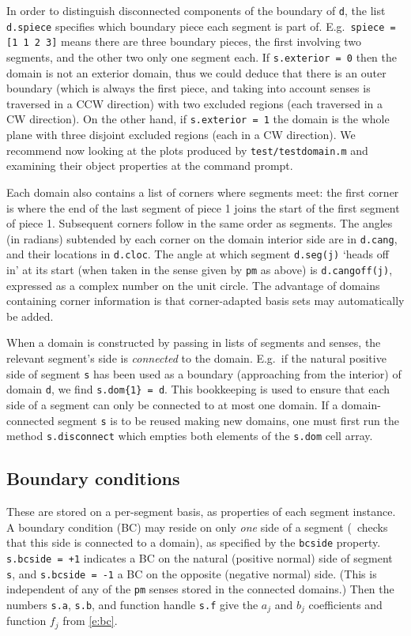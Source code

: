 \documentclass[12pt]{article}
\begin{document}
In order to distinguish disconnected components of the boundary of
{\tt d}, the list {\tt d.spiece} specifies which boundary piece each
segment is part of. E.g.\ {\tt spiece = [1 1 2 3]} means
there are three boundary pieces, the first involving
two segments, and the other two only one segment each.
If {\tt s.exterior = 0}
then the domain is not an exterior domain, thus we could deduce that
there is an outer boundary (which is always the first piece, and 
taking into account senses is traversed in a CCW direction)
with two excluded regions (each traversed in a CW direction).
On the other hand, if {\tt s.exterior = 1} the domain is the whole plane
with three disjoint excluded regions (each in a CW direction).
We recommend now looking at the plots produced by
{\tt test/testdomain.m} and examining their object properties
at the command prompt.

Each domain also contains a list of corners where segments meet:
the first corner is where the
end of the last segment of piece 1 joins the start of the first segment
of piece 1. Subsequent corners follow in the same order as segments.
The angles (in radians) subtended by each 
corner on the domain interior side are in {\tt d.cang}, and their
locations in {\tt d.cloc}.
The angle at which segment {\tt d.seg(j)}
`heads off in' at its start (when taken in the sense given by
{\tt pm} as above) is {\tt d.cangoff(j)},
expressed as a complex number on the unit circle.
The advantage of domains containing corner information is that
corner-adapted basis sets may automatically be added.

When a domain is constructed by passing in lists of segments
and senses, the relevant segment's side is {\em connected} to the domain.
E.g.\ if the natural positive side of segment {\tt s} has been used
as a boundary (approaching from the interior) of domain {\tt d},
we find \verb?s.dom{1} = d?.
This bookkeeping is used to ensure that each side of a segment
can only be connected to at most one domain.
If a domain-connected segment {\tt s} is to be reused making new domains,
one must first run the method {\tt s.disconnect}
which empties both elements of the {\tt s.dom} cell array.


\subsection{Boundary conditions}

These are stored on a per-segment basis, as properties of each segment
instance. A boundary condition (BC) may reside on only {\em one} side of a
segment (\mpspack\ checks that this side is connected to a domain),
as specified by the {\tt bcside} property.
{\tt s.bcside = +1} indicates a BC on the natural (positive
normal) side of segment {\tt s}, and {\tt s.bcside = -1} a BC on the
opposite (negative normal) side.
(This is independent of any of the {\tt pm} senses stored in the connected
domains.)
Then the numbers {\tt s.a}, {\tt s.b},
and function handle {\tt s.f} give the
$a_j$ and $b_j$ coefficients and function $f_j$ from \eqref{e:bc}.
\end{document}

